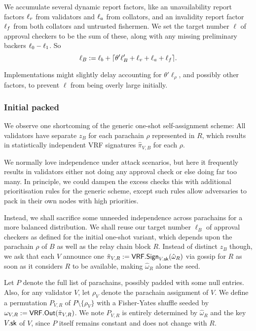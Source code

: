 We accumulate several dynamic report factors, like an unavailability report factors $\ell_v$ from validators and $\ell_a$ from collators, and an invalidity report factor $\ell_f$ from both collators and untrusted fishermen.  We set the target number $\ell$ of approval checkers to be the sum of these, along with any missing preliminary backers $\ell_0-\ell_1$.  So
$$ \ell_B := \ell_b + \lceil \theta' \ell'_B + \ell_v + \ell_a + \ell_f \rceil . $$

Implementations might slightly delay accounting for $\theta' \ell_\rho$, and possibly other factors, to prevent $\ell$ from being overly large initially. 

\subsubsection{Initial packed}

We observe one shortcoming of the generic one-shot self-assignment scheme:  All validators have separate $z_B$ for each parachain $\rho$ represented in $R$, which results in statistically independent VRF signatures $\hat{\pi}_{V,B}$ for each $\rho$.  

We normally love independence under attack scenarios, but here it frequently results in validators either not doing any approval check or else doing far too many.  In principle, we could dampen the excess checks this with additional prioritisation rules for the generic scheme, except such rules allow adversaries to pack in their own nodes with high priorities.

Instead, we shall sacrifice some unneeded independence across parachains for a more balanced distribution.
%
We shall reuse our target number $\ell_B$ of approval checkers as defined for the initial one-shot variant, which depends upon the parachain $\rho$ of $B$ as well as the relay chain block $R$.
%
Instead of distinct $z_B$ though, we ask that each $V$ announce one $\tilde{\pi}_{V,R} := \mathsf{VRF}.\mathsf{Sign}_{V.\mathsf{sk}}(\hat{\omega}_R)$ via gossip for $R$ as soon as it considers $R$ to be available, making $\hat{\omega}_R$ alone the seed.


Let $P$ denote the full list of parachains, possibly padded with some null entries.
Also, for any validator $V$, let $\rho_V$ denote the parachain assignment of $V$.
We define a permutation $P_{V,R}$ of $P \setminus \{ \rho_V \}$ with a Fisher-Yates shuffle seeded by $\omega_{V,R} := \mathsf{VRF}.\mathsf{Out}(\tilde{\pi}_{V,R})$.  We note $P_{V,R}$ is entirely determined by $\hat{\omega}_R$ and the key $V.\mathsf{sk}$ of $V$, since $P$ itself remains constant and does not change with $R$.

